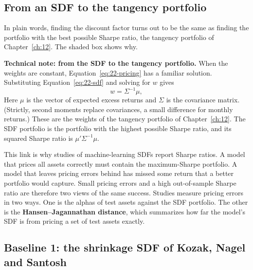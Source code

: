 \subsection{From an SDF to the tangency portfolio}

In plain words, finding the discount factor turns out to be the same as finding the portfolio with the best possible Sharpe ratio, the tangency portfolio of Chapter~\ref{ch:12}. The shaded box shows why.

\begin{technote}
\textbf{Technical note: from the SDF to the tangency portfolio.} When the weights are constant, Equation~\eqref{eq:22-pricing} has a familiar solution. Substituting Equation~\eqref{eq:22-sdf} and solving for $w$ gives
\begin{equation}
  w = \Sigma^{-1} \mu,
  \label{eq:22-tangency}
\end{equation}
Here $\mu$ is the vector of expected excess returns and $\Sigma$ is the covariance matrix. (Strictly, second moments replace covariances, a small difference for monthly returns.) These are the weights of the tangency portfolio of Chapter~\ref{ch:12}. The SDF portfolio is the portfolio with the highest possible Sharpe ratio, and its squared Sharpe ratio is $\mu'\Sigma^{-1}\mu$.
\end{technote}

This link is why studies of machine-learning SDFs report Sharpe ratios. A model that prices all assets correctly must contain the maximum-Sharpe portfolio. A model that leaves pricing errors behind has missed some return that a better portfolio would capture. Small pricing errors and a high out-of-sample Sharpe ratio are therefore two views of the same success. Studies measure pricing errors in two ways. One is the alphas of test assets against the SDF portfolio. The other is the \textbf{Hansen--Jagannathan distance}, which summarizes how far the model's SDF is from pricing a set of test assets exactly.

\subsection{Baseline 1: the shrinkage SDF of Kozak, Nagel and Santosh}

